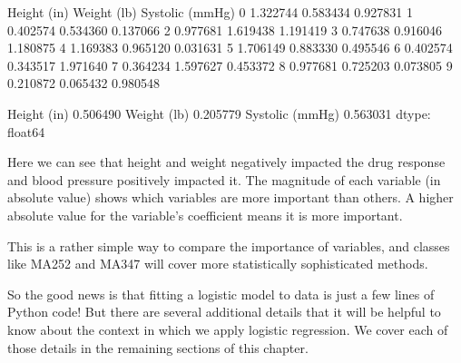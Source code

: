 \documentclass[letterpaper,10pt,english]{sphinxmanual}
\begin{document}
\begin{sphinxVerbatim}[commandchars=\\\{\}]
   Height (in)  Weight (lb)  Systolic (mmHg)
0     1.322744    \PYGZhy{}0.583434        \PYGZhy{}0.927831
1    \PYGZhy{}0.402574     0.534360        \PYGZhy{}0.137066
2    \PYGZhy{}0.977681    \PYGZhy{}1.619438        \PYGZhy{}1.191419
3     0.747638     0.916046         1.180875
4    \PYGZhy{}1.169383    \PYGZhy{}0.965120        \PYGZhy{}0.031631
5     1.706149    \PYGZhy{}0.883330         0.495546
6    \PYGZhy{}0.402574     0.343517         1.971640
7     0.364234     1.597627        \PYGZhy{}0.453372
8    \PYGZhy{}0.977681     0.725203         0.073805
9    \PYGZhy{}0.210872    \PYGZhy{}0.065432        \PYGZhy{}0.980548
\end{sphinxVerbatim}

\begin{sphinxVerbatim}[commandchars=\\\{\}]
  
   
  \PYG{p}{[}\PYG{p}{]}
   
\end{sphinxVerbatim}

\begin{sphinxVerbatim}[commandchars=\\\{\}]
Height (in)       \PYGZhy{}0.506490
Weight (lb)       \PYGZhy{}0.205779
Systolic (mmHg)    0.563031
dtype: float64
\end{sphinxVerbatim}

Here we can see that height and weight negatively impacted the drug response and blood pressure positively impacted it.  The magnitude of each variable (in absolute value) shows which variables are more important than others.  A higher absolute value for the variable’s coefficient means it is more important.

This is a rather simple way to compare the importance of variables, and classes like MA252 and MA347 will cover more statistically sophisticated methods.

So the good news is that fitting a logistic model to data is just a few lines of Python code!  But there are several additional details that it will be helpful to know about the context in which we apply logistic regression.  We cover each of those details in the remaining sections of this chapter.
\end{document}

